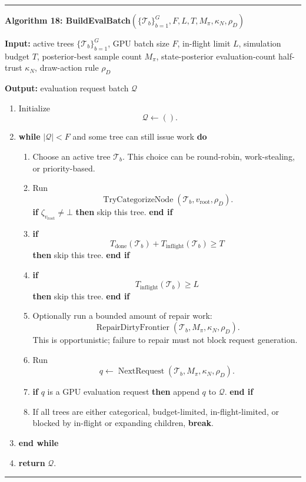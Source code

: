 \documentclass[11pt]{article}
\newcommand{\Tree}{\mathcal{T}}
\newcommand{\NextRequest}{\operatorname{NextRequest}}
\newcommand{\RepairDirtyFrontier}{\operatorname{RepairDirtyFrontier}}
\newcommand{\TryCategorizeNode}{\operatorname{TryCategorizeNode}}
\newenvironment{algorithmblock}[1]
{
  \par\medskip
  \noindent\hrule\par\smallskip
  \noindent\textbf{#1}
  \par\smallskip
}
{
  \par\smallskip\noindent\hrule\par\medskip
}
\newcommand{\Input}{\textbf{Input: }}
\newcommand{\Output}{\textbf{Output: }}
\newcommand{\Return}{\textbf{return }}
\newcommand{\If}{\textbf{if }}
\newcommand{\Then}{\textbf{ then }}
\newcommand{\EndIf}{\textbf{end if}}
\newcommand{\While}{\textbf{while }}
\newcommand{\EndWhile}{\textbf{end while}}
\newcommand{\Do}{\textbf{ do }}
\newcommand{\Break}{\textbf{break}}
\begin{document}
\begin{algorithmblock}{Algorithm 18: BuildEvalBatch\((\{\Tree_b\}_{b=1}^{G},F,L,T,M_\pi,\kappa_N,\rho_D)\)}

\Input active trees \(\{\Tree_b\}_{b=1}^{G}\), GPU batch size \(F\), in-flight limit \(L\), simulation budget \(T\), posterior-best sample count \(M_\pi\), state-posterior evaluation-count half-trust \(\kappa_N\), draw-action rule \(\rho_D\)

\Output evaluation request batch \(\mathcal{Q}\)

\begin{enumerate}[leftmargin=2em]
  \item Initialize
  \[
  \mathcal{Q} \gets ().
  \]

  \item \While \(|\mathcal{Q}| < F\) and some tree can still issue work \Do

  \begin{enumerate}[leftmargin=2em]
    \item Choose an active tree \(\Tree_b\). This choice can be round-robin,
    work-stealing, or priority-based.

    \item Run
    \[
    \TryCategorizeNode(\Tree_b,v_{\mathrm{root}},\rho_D).
    \]
    \If \(\zeta_{v_{\mathrm{root}}}\ne\bot\) \Then skip this tree. \EndIf

    \item \If
    \[
    T_{\mathrm{done}}(\Tree_b)+T_{\mathrm{inflight}}(\Tree_b) \ge T
    \]
    \Then skip this tree. \EndIf

    \item \If
    \[
    T_{\mathrm{inflight}}(\Tree_b) \ge L
    \]
    \Then skip this tree. \EndIf

    \item Optionally run a bounded amount of repair work:
    \[
    \RepairDirtyFrontier(\Tree_b,M_\pi,\kappa_N,\rho_D).
    \]
    This is opportunistic; failure to repair must not block request generation.

    \item Run
    \[
    q
    \gets
    \NextRequest(\Tree_b,M_\pi,\kappa_N,\rho_D).
    \]

    \item \If \(q\) is a GPU evaluation request \Then append \(q\) to
    \(\mathcal{Q}\). \EndIf

    \item If all trees are either categorical, budget-limited, in-flight-limited,
    or blocked by in-flight or expanding children, \Break.

  \end{enumerate}

  \item \EndWhile

  \item \Return \(\mathcal{Q}\).
\end{enumerate}

\end{algorithmblock}
\end{document}

